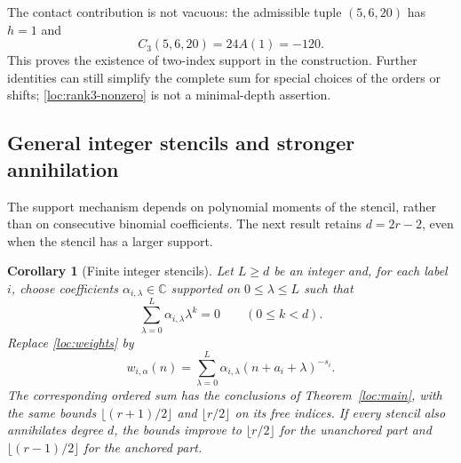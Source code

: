 \documentclass[11pt,a4paper]{article}
\numberwithin{equation}{section}
\newtheorem{corollary}[theorem]{Corollary}
\theoremstyle{definition}
\theoremstyle{remark}
\newcommand{\C}{\mathbb C}
\begin{document}
The contact contribution is not vacuous: the admissible tuple
$(5,6,20)$ has $h=1$ and
\begin{equation}
 C_3(5,6,20)=24A(1)=-120.
 \label{loc:rank3-nonzero}
\end{equation}
This proves the existence of two-index support in the construction.
Further identities can still simplify the complete sum for special
choices of the orders or shifts; \eqref{loc:rank3-nonzero} is not a
minimal-depth assertion.

\subsection{General integer stencils and stronger annihilation}

The support mechanism depends on polynomial moments of the stencil,
rather than on consecutive binomial coefficients.  The next result
retains $d=2r-2$, even when the stencil has a larger support.

\begin{corollary}[Finite integer stencils]
\label{loc:general-stencil}
Let $L\ge d$ be an integer and, for each label $i$, choose coefficients
$\alpha_{i,\lambda}\in\C$ supported on $0\le\lambda\le L$ such that
\begin{equation}
 \sum_{\lambda=0}^L\alpha_{i,\lambda}\lambda^k=0
                      \qquad(0\le k<d).
 \label{loc:stencil-moments}
\end{equation}
Replace \eqref{loc:weights} by
\[
 w_{i,\alpha}(n)=\sum_{\lambda=0}^L
                     \alpha_{i,\lambda}(n+a_i+\lambda)^{-s_i}.
\]
The corresponding ordered sum has the conclusions of
Theorem~\ref{loc:main}, with the same bounds
$\lfloor(r+1)/2\rfloor$ and $\lfloor r/2\rfloor$ on its free indices.
If every stencil also annihilates degree $d$, the bounds improve to
$\lfloor r/2\rfloor$ for the unanchored part and
$\lfloor(r-1)/2\rfloor$ for the anchored part.
\end{corollary}
\end{document}
